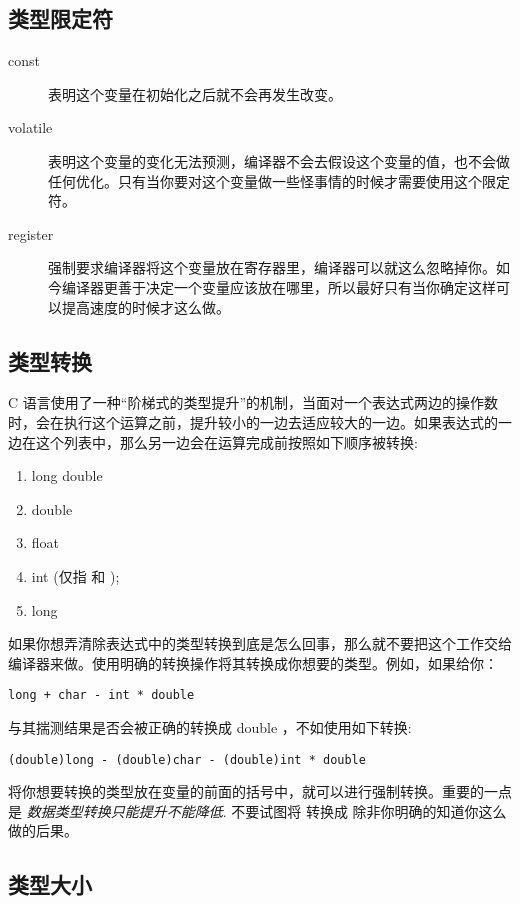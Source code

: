 \subsection{类型限定符}

\begin{description}
\item[const] 表明这个变量在初始化之后就不会再发生改变。
\item[volatile] 表明这个变量的变化无法预测，编译器不会去假设这个变量的值，也不会做任何优化。只有当你要对这个变量做一些怪事情的时候才需要使用这个限定符。
\item[register] 强制要求编译器将这个变量放在寄存器里，编译器可以就这么忽略掉你。如今编译器更善于决定一个变量应该放在哪里，所以最好只有当你确定这样可以提高速度的时候才这么做。
\end{description}


\subsection{类型转换}

C 语言使用了一种“阶梯式的类型提升”的机制，当面对一个表达式两边的操作数时，会在执行这个运算之前，提升较小的一边去适应较大的一边。如果表达式的一边在这个列表中，那么另一边会在运算完成前按照如下顺序被转换: 

\begin{enumerate}
\item long double
\item double 
\item float
\item int (仅指  和 );
\item long
\end{enumerate}

如果你想弄清除表达式中的类型转换到底是怎么回事，那么就不要把这个工作交给编译器来做。使用明确的转换操作将其转换成你想要的类型。例如，如果给你：

\verb|long + char - int * double|

与其揣测结果是否会被正确的转换成 double ，不如使用如下转换:

\verb|(double)long - (double)char - (double)int * double|

将你想要转换的类型放在变量的前面的括号中，就可以进行强制转换。重要的一点是
\emph{数据类型转换只能提升不能降低}.  不要试图将  转换成 
除非你明确的知道你这么做的后果。

\subsection{类型大小}

